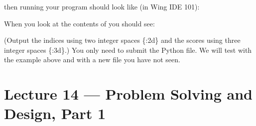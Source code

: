\documentclass[letterpaper,10pt,english]{sphinxmanual}
\begin{document}
\begin{enumerate}
then running your program should look like (in Wing IDE 101):

\begin{sphinxVerbatim}[commandchars=\\\{\}]
    
    
\end{sphinxVerbatim}

When you look at the contents of  you should
see:

\begin{sphinxVerbatim}[commandchars=\\\{\}]
  
  
  
  
  
  
  
 
\end{sphinxVerbatim}

(Output the indices using two integer spaces \{:2d\} and the scores using
three integer spaces \{:3d\}.) You only need to submit the Python file. We will test with the
example above and with a new file you have not seen.

\end{enumerate}


\chapter{Lecture 14 — Problem Solving and Design, Part 1}
\label{\detokenize{lecture_notes/lec14_design_part1:lecture-14-problem-solving-and-design-part-1}}\label{\detokenize{lecture_notes/lec14_design_part1::doc}}
\end{document}

